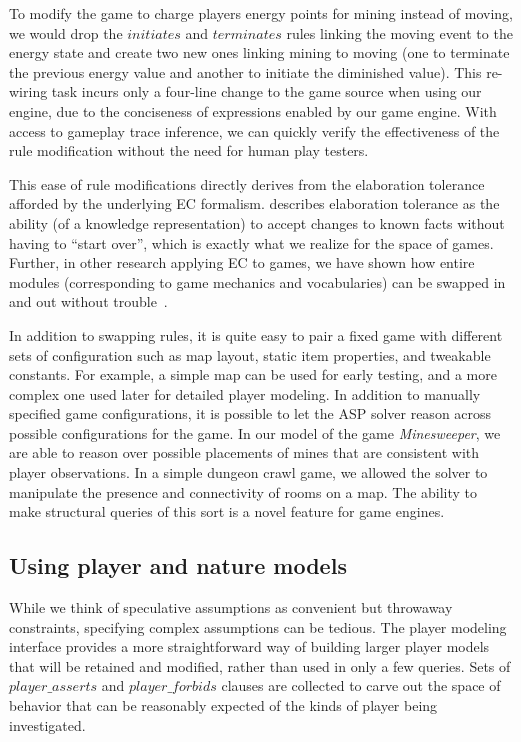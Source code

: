\documentclass[conference]{IEEEtran}
\newcommand{\logical}[1]{$#1$}
\begin{document}
To modify the game to charge players energy points for mining instead of
moving, we would drop the \logical{initiates} and \logical{terminates} rules
linking the moving event to the energy state and create two new ones linking
mining to moving (one to terminate the previous energy value and another to
initiate the diminished value). This re-wiring task incurs only a four-line
change to the game source when using our engine, due to the conciseness of
expressions enabled by our game engine.  With access to gameplay trace
inference, we can quickly verify the effectiveness of the rule modification
without the need for human play testers.

This ease of rule modifications directly derives from the elaboration tolerance
afforded by the underlying EC formalism.  \citet{McCarthy:elaboration}
describes elaboration tolerance as the ability (of a knowledge representation)
to accept changes to known facts without having to ``start over'', which is exactly
what we realize for the space of games. Further, in other research applying EC
to games, we have shown how entire modules (corresponding to game mechanics and
vocabularies) can be swapped in and out without trouble~\citep{AIIDE08}.

In addition to swapping rules, it is quite easy to pair a fixed game with
different sets of configuration such as map layout, static item properties, and
tweakable constants.  For example, a simple map can be used for early testing,
and a more complex one used later for detailed player modeling.  In addition to
manually specified game configurations, it is possible to let the ASP solver
reason across possible configurations for the game. In our model of the game
\emph{Minesweeper}, we are able to reason over possible placements of mines
that are consistent with player observations. In a simple dungeon crawl game,
we allowed the solver to manipulate the presence and connectivity of rooms on a
map. The ability to make structural queries of this sort is a novel feature for
game engines.

\subsection{Using player and nature models}

While we think of speculative assumptions as convenient but throwaway
constraints, specifying complex assumptions can be tedious. The player modeling
interface provides a more straightforward way of building larger player models
that will be retained and modified, rather than used in only a few queries.
Sets of \logical{player\_asserts} and \logical{player\_forbids} clauses are
collected to carve out the space of behavior that can be reasonably expected of
the kinds of player being investigated.
\end{document}
